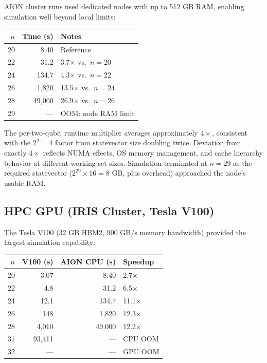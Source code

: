 \documentclass[sigconf, authorversion=true, nonacm=true]{acmart}
\begin{document}
AION cluster runs used dedicated nodes with up to 512 GB RAM, enabling simulation well beyond local limits:

\begin{center}
\begin{tabular}{rrl}
\toprule
$n$ & Time (s) & Notes \\
\midrule
20 & 8.40    & Reference \\
22 & 31.2    & 3.7$\times$ vs.\ $n{=}20$ \\
24 & 134.7   & 4.3$\times$ vs.\ $n{=}22$ \\
26 & 1,820   & 13.5$\times$ vs.\ $n{=}24$ \\
28 & 49,000  & 26.9$\times$ vs.\ $n{=}26$ \\
29 & ---     & OOM: node RAM limit \\
\bottomrule
\end{tabular}
\end{center}

The per-two-qubit runtime multiplier averages approximately $4\times$, consistent with the $2^2 = 4$ factor from statevector size doubling twice. Deviation from exactly $4\times$ reflects NUMA effects, OS memory management, and cache hierarchy behavior at different working-set sizes. Simulation terminated at $n=29$ as the required statevector ($2^{29} \times 16 = 8$ GB, plus overhead) approached the node's usable RAM.

\subsection{HPC GPU (IRIS Cluster, Tesla V100)}

The Tesla V100 (32 GB HBM2, 900 GB/s memory bandwidth) provided the largest simulation capability:

\begin{center}
\begin{tabular}{rrrl}
\toprule
$n$ & V100 (s) & AION CPU (s) & Speedup \\
\midrule
20 & 3.07   & 8.40    & 2.7$\times$ \\
22 & 4.8    & 31.2    & 6.5$\times$ \\
24 & 12.1   & 134.7   & 11.1$\times$ \\
26 & 148    & 1,820   & 12.3$\times$ \\
28 & 4,010  & 49,000  & 12.2$\times$ \\
31 & 93,411 & ---     & CPU OOM \\
32 & ---    & ---     & GPU OOM \\
\bottomrule
\end{tabular}
\end{center}
\end{document}
